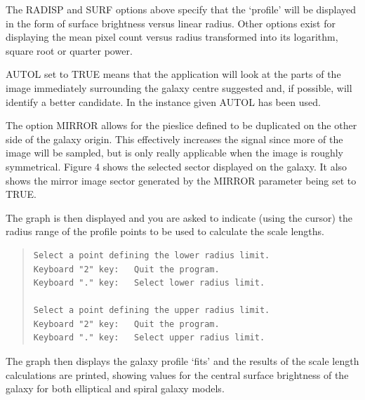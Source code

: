 \documentclass[twoside,11pt]{article}
\newenvironment{myquote}{\begin{quote}\begin{small}}{\end{small}\end{quote}}
\begin{document}
The RADISP and SURF options above specify that the `profile' will be displayed
in the form of surface brightness versus linear radius. Other options exist for
displaying the mean pixel count versus radius transformed into its
logarithm, square root or quarter power.

AUTOL set to TRUE means that the application will look at the parts of the
image immediately surrounding the galaxy centre suggested
and, if possible, will identify a better candidate. In the instance given
AUTOL has been used.

The option MIRROR allows for the pieslice
defined to be duplicated on the other side of the galaxy
origin. This effectively increases the signal since more of the image will be
sampled, but is only really applicable when the image is roughly
symmetrical. Figure 4 shows the selected sector displayed on the galaxy. It
also shows the mirror image sector generated by the MIRROR parameter being
set to TRUE.

The graph is then displayed and you are asked to indicate (using the cursor)
the radius range of the profile points to be used to calculate the scale
lengths.

\begin{myquote}
\begin{verbatim}
Select a point defining the lower radius limit.
Keyboard "2" key:   Quit the program.
Keyboard "." key:   Select lower radius limit.

Select a point defining the upper radius limit.
Keyboard "2" key:   Quit the program.
Keyboard "." key:   Select upper radius limit.
\end{verbatim}
\end{myquote}

The graph then displays the galaxy profile `fits' and the
results of the scale length calculations are printed, showing
values for the central surface brightness of the galaxy for both elliptical
and spiral galaxy models.
\end{document}
